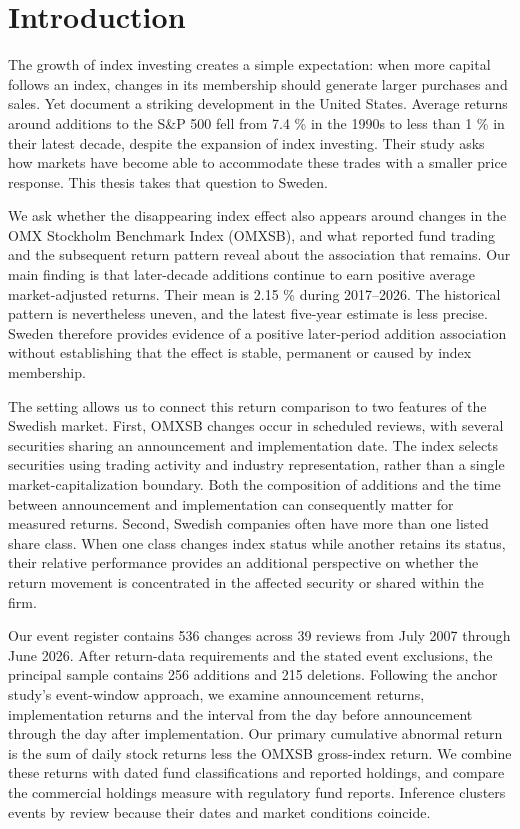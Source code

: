 \section{Introduction}

The growth of index investing creates a simple expectation: when more capital follows an index, changes in its membership should generate larger purchases and sales. Yet \citet{greenwood2025} document a striking development in the United States. Average returns around additions to the S\&P 500 fell from 7.4 \% in the 1990s to less than 1 \% in their latest decade, despite the expansion of index investing. Their study asks how markets have become able to accommodate these trades with a smaller price response. This thesis takes that question to Sweden.

We ask whether the disappearing index effect also appears around changes in the OMX Stockholm Benchmark Index (OMXSB), and what reported fund trading and the subsequent return pattern reveal about the association that remains. Our main finding is that later-decade additions continue to earn positive average market-adjusted returns. Their mean is 2.15 \% during 2017--2026. The historical pattern is nevertheless uneven, and the latest five-year estimate is less precise. Sweden therefore provides evidence of a positive later-period addition association without establishing that the effect is stable, permanent or caused by index membership.

The setting allows us to connect this return comparison to two features of the Swedish market. First, OMXSB changes occur in scheduled reviews, with several securities sharing an announcement and implementation date. The index selects securities using trading activity and industry representation, rather than a single market-capitalization boundary. Both the composition of additions and the time between announcement and implementation can consequently matter for measured returns. Second, Swedish companies often have more than one listed share class. When one class changes index status while another retains its status, their relative performance provides an additional perspective on whether the return movement is concentrated in the affected security or shared within the firm.

Our event register contains 536 changes across 39 reviews from July 2007 through June 2026. After return-data requirements and the stated event exclusions, the principal sample contains 256 additions and 215 deletions. Following the anchor study's event-window approach, we examine announcement returns, implementation returns and the interval from the day before announcement through the day after implementation. Our primary cumulative abnormal return is the sum of daily stock returns less the OMXSB gross-index return. We combine these returns with dated fund classifications and reported holdings, and compare the commercial holdings measure with regulatory fund reports. Inference clusters events by review because their dates and market conditions coincide.

